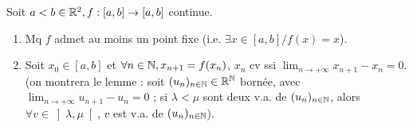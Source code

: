 \begin{statementbox}
Soit $a < b \in \mathbb R^2, f : [a,b] \to [a,b]$ continue.
\begin{enumerate}[label=\alph*)]
  \item Mq $f$ admet au moins un point fixe (i.e. $\exists x \in [a,b] / f(x) = x$).
  \item Soit $x_0 \in [a,b]$ et $\forall n \in \mathbb N, x_{n+1} = f(x_n)$, $x_n$ cv ssi $\lim_{n \to +\infty} x_{n+1} - x_n = 0$.
  (on montrera le lemme : soit $(u_n)_{n \in \mathbb N} \in \mathbb R^\mathbb N$ bornée, avec $\lim_{n \to +\infty} u_{n+1} - u_n = 0$ ; si $\lambda < \mu$ sont deux v.a. de $(u_n)_{n \in \mathbb N}$, alors $\forall v \in \left] \lambda, \mu \right[$, $v$ est v.a. de $(u_n)_{n \in \mathbb N}$).
\end{enumerate}
\end{statementbox}

